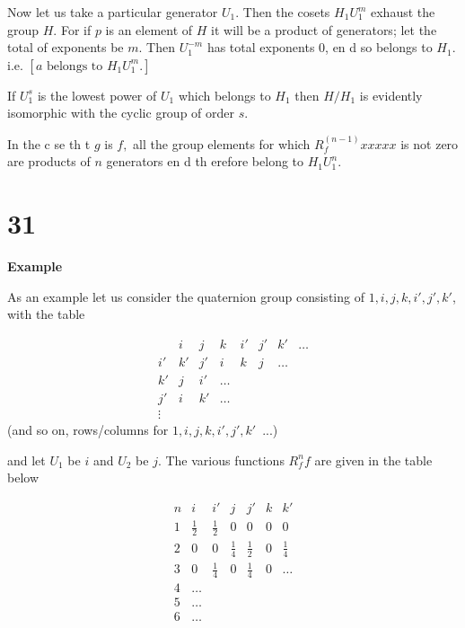 \documentclass[12pt]{article}
\begin{document}
Now let us take a particular generator \(U_1\). Then the cosets
\(H_1 U_1^m\) exhaust the group \(H\). For if \(p\) is an element of \(H\) it will
be a product of generators; let the total of exponents be \(m\).
Then \(U_1^{-m}\) has total exponents 0, en d so belongs to \(H_1\). 
i.e. \([a \text{ belongs to } H_1 U_1^m.]\)

If \(U_1^s\) is the lowest power of \(U_1\) which
belongs to \(H_1\) then \(H/H_1\) is evidently isomorphic with the
cyclic group of order \(s\).

In the c se th t \(g\) is \(f,\) all the
group elements for which \(R_f^{(n-1)} xxxxx\) is not zero are products
of \(n\) generators en d th erefore belong to \(H_1 U_1^n.\)

\section{31}

\noindent
\textbf{Example}

As an example let us consider the quaternion group
consisting of \(1, i, j, k, i', j', k'\), with the table

\[
\begin{array}{c|ccccccc}
   & i & j & k & i' & j' & k' & \dots \\
\hline
i' & k' & j' & i  & k  & j  & \dots & \\
k' & j  & i' & \dots &   &    &       & \\
j' & i  & k' & \dots &   &    &       & \\
\vdots &  &   &      &   &    &       & 
\end{array}
\]
(and so on, rows/columns for \(1,i,j,k,i',j',k'\)\, ...)

and let \(U_1\) be \(i\) and \(U_2\) be \(j\). The various functions \(R_f^n f\)
are given in the table below

\[
\begin{array}{c|cccccc}
  n & i & i' & j & j' & k & k' \\
\hline
 1 & \tfrac{1}{2} & \tfrac{1}{2} & 0 & 0 & 0 & 0 \\
 2 & 0 & 0 & \tfrac{1}{4} & \tfrac{1}{2} & 0 & \tfrac{1}{4} \\
 3 & 0 & \tfrac{1}{4} & 0 & \tfrac{1}{4} & 0 & \dots \\
 4 & \dots & & & & & \\
 5 & \dots & & & & & \\
 6 & \dots & & & & & \\
\end{array}
\]
\end{document}
